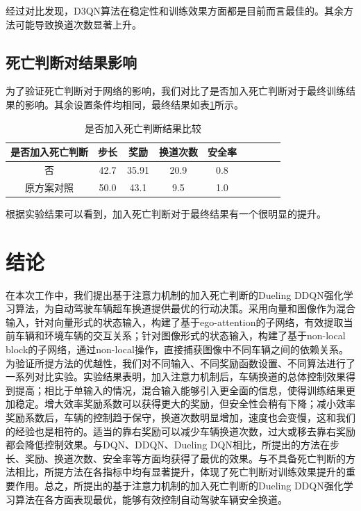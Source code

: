\documentclass[letterpaper, 10 pt, conference]{ieeeconf}  %
\begin{document}
经过对比发现，D3QN算法在稳定性和训练效果方面都是目前而言最佳的。其余方法可能导致换道次数显著上升。
\subsection[]{死亡判断对结果影响}
为了验证死亡判断对于网络的影响，我们对比了是否加入死亡判断对于最终训练结果的影响。其余设置条件均相同，最终结果如表\ref{deadnot}所示。
\begin{table}[!htbp] 
    \centering
    \caption{是否加入死亡判断结果比较}
    \begin{tabular}{ccccccccccc} %
    \toprule %
    \multicolumn{3}{c}{是否加入死亡判断}& 步长& 奖励&换道次数&安全率\\
    \hline %
    \multicolumn{3}{c}{否}& 42.7& 35.91& 20.9 &0.8& \\   %
    \multicolumn{3}{c}{原方案对照}& 50.0& 43.1& 9.5 &1.0& \\
    \bottomrule %
    \end{tabular}   
    \label{deadnot} 
\end{table}

根据实验结果可以看到，加入死亡判断对于最终结果有一个很明显的提升。

\section{结论}
在本次工作中，我们提出基于注意力机制的加入死亡判断的Dueling DDQN强化学习算法，为自动驾驶车辆超车换道提供最优的行动决策。采用向量和图像作为混合输入，针对向量形式的状态输入，构建了基于ego-attention的子网络，有效提取当前车辆和环境车辆的交互关系；针对图像形式的状态输入，构建了基于non-local block的子网络，通过non-local操作，直接捕获图像中不同车辆之间的依赖关系。为验证所提方法的优越性，我们对不同输入、不同奖励函数设置、不同算法进行了一系列对比实验。实验结果表明，加入注意力机制后，车辆换道的总体控制效果得到提高；相比于单输入的情况，混合输入能够引入更全面的信息，使得训练结果更加稳定。增大效率奖励系数可以获得更大的奖励，但安全性会稍有下降；减小效率奖励系数后，车辆的控制趋于保守，换道次数明显增加，速度也会变慢，这和我们的经验也是相符的。适当的靠右奖励可以减少车辆换道次数，过大或移去靠右奖励都会降低控制效果。与DQN、DDQN、Dueling DQN相比，所提出的方法在步长、奖励、换道次数、安全率等方面均获得了最优的效果。与不具备死亡判断的方法相比，所提方法在各指标中均有显著提升，体现了死亡判断对训练效果提升的重要作用。总之，所提出的基于注意力机制的加入死亡判断的Dueling DDQN强化学习算法在各方面表现最优，能够有效控制自动驾驶车辆安全换道。
\end{document}
